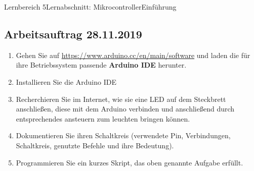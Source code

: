 \documentclass[oneside,openany,headings=optiontotoc,11pt,numbers=noenddot]{scrreprt}
\begin{document}
		\begin{worksheet}{Lernbereich 5}{Lernabschnitt: Mikrocontroller}{Einführung}
			\begin{framed}
				\noindent
				\section*{Arbeitsauftrag 28.11.2019}
				\renewcommand{\arraystretch}{1.5}
				\begin{enumerate}
					\item Gehen Sie auf \url{https://www.arduino.cc/en/main/software} und laden die für ihre Betriebssystem
					passende \textbf{Arduino IDE} herunter.
					\item Installieren Sie die Arduino IDE\\
					\item Recherchieren Sie im Internet, wie sie eine LED auf dem Steckbrett anschließen, diese mit dem Arduino verbinden und anschließend durch entsprechendes ansteuern zum leuchten bringen können.
					\item Dokumentieren Sie ihren Schaltkreis (verwendete Pin, Verbindungen, Schaltkreis, genutzte Befehle und ihre Bedeutung).
					\item Programmieren Sie ein kurzes Skript, das oben genannte Aufgabe erfüllt.\\
				\end{enumerate}
			\end{framed}
		\end{worksheet}
\end{document}
